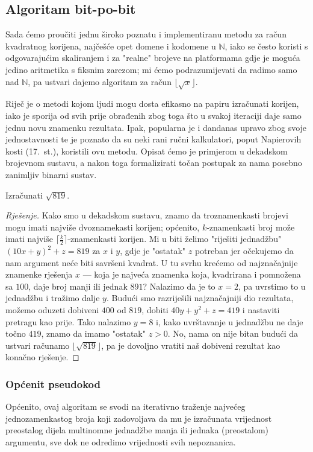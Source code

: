 \documentclass[12pt]{scrartcl}
\newcommand{\primjer}[2]{%
    \renewcommand\qedsymbol{$\vartriangleleft$}%
    \begin{example}%
        #1%
    \end{example}%
    \begin{proof}[Rješenje]%
        #2%
    \end{proof}%
    \renewcommand\qedsymbol{$\square$}
}
\begin{document}
\subsection{Algoritam bit-po-bit}
Sada ćemo proučiti jednu široko poznatu i implementiranu metodu za račun kvadratnog korijena, najčešće opet domene i kodomene u
$\mathbb{N}$, iako se često koristi s odgovarajućim skaliranjem i za "realne" brojeve
 na platformama gdje je moguća jedino aritmetika s fiksnim zarezom; mi ćemo podrazumijevati da radimo samo nad $\mathbb N$, pa ustvari
 dajemo algoritam za račun $\lfloor\sqrt x\rfloor$.

Riječ je o metodi kojom ljudi mogu dosta efikasno na papiru izračunati korijen, iako je sporija od svih prije obrađenih zbog toga
što u svakoj iteraciji daje samo jednu novu znamenku rezultata. Ipak, popularna je i dandanas upravo zbog svoje jednostavnosti te je
poznato da su neki rani ručni kalkulatori, poput Napierovih kosti (17.\ st.), koristili ovu metodu.
 Opisat ćemo je primjerom
u dekadskom brojevnom sustavu, a nakon toga formalizirati točan postupak za nama posebno zanimljiv binarni sustav.

\primjer{Izračunati $\sqrt{819}$.}
{Kako smo u dekadskom sustavu, znamo da troznamenkasti brojevi mogu imati najviše dvoznamekasti korijen; općenito, $k$-znamenkasti broj
može imati najviše $\lceil\frac{k}{2}\rceil$-znamenkasti korijen. Mi u biti želimo "riješiti jednadžbu" $(10x+y)^2+z=819$ za $x$ i $y$, gdje je 
"ostatak" $z$ potreban jer očekujemo da nam argument neće biti savršeni kvadrat. U tu svrhu krećemo od najznačajnije znamenke rješenja
$x$ --- koja je najveća znamenka koja, kvadrirana i pomnožena sa $100$, daje broj manji ili jednak $891$? Nalazimo da je to $x=2$, pa
uvrstimo to u jednadžbu i tražimo dalje $y$. Budući smo razriješili najznačajniji dio rezultata, možemo oduzeti dobiveni $400$ od $819$,
dobiti $40y+y^2+z=419$
i nastaviti pretragu kao prije. Tako nalazimo $y=8$ i, kako uvrštavanje u jednadžbu ne daje točno $419$,
znamo da imamo "ostatak" $z>0$. No, nama on nije bitan budući da ustvari računamo $\lfloor\sqrt{819}\rfloor$, pa je
 dovoljno vratiti naš dobiveni rezultat kao konačno rješenje.}

\subsubsection{Općenit pseudokod}
Općenito, ovaj algoritam se svodi na iterativno traženje najvećeg jednozamenkastog
broja koji zadovoljava da mu je izračunata vrijednost preostalog dijela multinomne jednadžbe manja ili jednaka (preostalom) argumentu, sve
dok ne odredimo vrijednosti svih nepoznanica.
\end{document}
